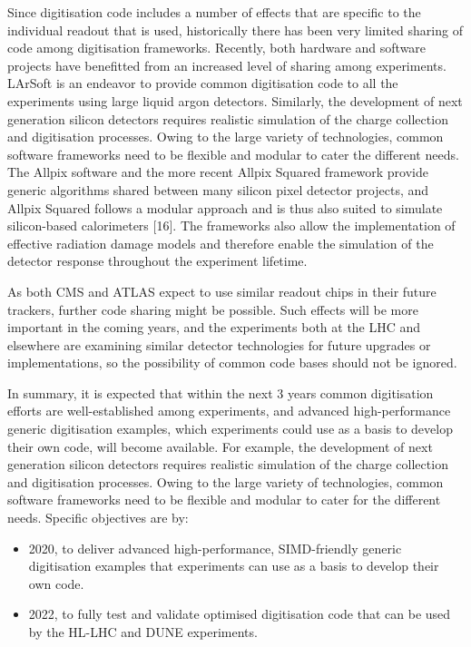 \documentclass[12pt,a4paper]{article}
\begin{document}
Since digitisation code includes a number of effects that are specific
to the individual readout that is used, historically there has been very
limited sharing of code among digitisation frameworks. Recently, both
hardware and software projects have benefitted from an increased level
of sharing among experiments. LArSoft is an endeavor to provide common
digitisation code to all the experiments using large liquid argon
detectors. Similarly, the development of next generation silicon
detectors requires realistic simulation of the charge collection and
digitisation processes. Owing to the large variety of technologies,
common software frameworks need to be flexible and modular to cater the
different needs. The Allpix software and the more recent Allpix Squared
framework provide generic algorithms shared between many silicon pixel
detector projects, and Allpix Squared follows a modular approach and is
thus also suited to simulate silicon-based calorimeters {[}16{]}. The
frameworks also allow the implementation of effective radiation damage
models and therefore enable the simulation of the detector response
throughout the experiment lifetime.

As both CMS and ATLAS expect to use similar readout chips in their
future trackers, further code sharing might be possible. Such effects
will be more important in the coming years, and the experiments both at
the LHC and elsewhere are examining similar detector technologies for
future upgrades or implementations, so the possibility of common code
bases should not be ignored.

In summary, it is expected that within the next 3 years common
digitisation efforts are well-established among experiments, and
advanced high-performance generic digitisation examples, which
experiments could use as a basis to develop their own code, will become
available. For example, the development of next generation silicon
detectors requires realistic simulation of the charge collection and
digitisation processes. Owing to the large variety of technologies,
common software frameworks need to be flexible and modular to cater for
the different needs. Specific objectives are by:

\begin{itemize}
\item
  2020, to deliver advanced high-performance, SIMD-friendly generic
  digitisation examples that experiments can use as a basis to develop
  their own code.
\item
  2022, to fully test and validate optimised digitisation code that can
  be used by the HL-LHC and DUNE experiments.
\end{itemize}
\end{document}
